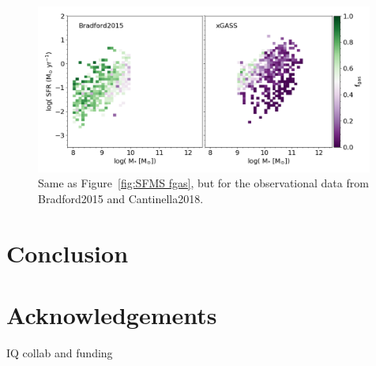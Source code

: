 \documentclass[fleqn,usenatbib]{mnras}
\begin{document}
\begin{figure}
\includegraphics[width = 0.99\textwidth]{SFMS_fits_2dhist_median_obs.png}
\caption{Same as Figure~\ref{fig:SFMS fgas}, but for the observational data from Bradford2015 and Cantinella2018.}
\label{fig:SFMS mstar 2D obs}
\end{figure}

\section{Conclusion}


\section*{Acknowledgements}
IQ collab and funding













\bsp	%
\label{lastpage}
\end{document}
